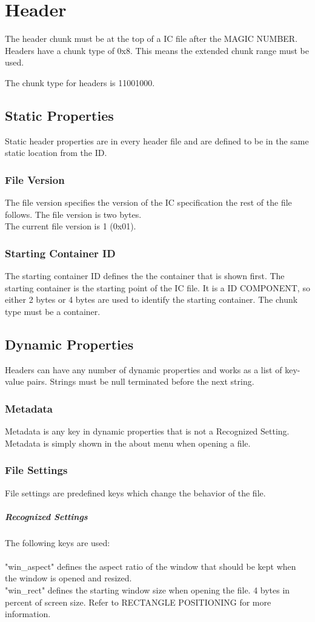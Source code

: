 \documentclass{report}
\begin{document}
\section{Header}
The header chunk must be at the top of a IC file after the MAGIC NUMBER. 
Headers have a chunk type of 0x8.
This means the extended chunk range must be used.

The chunk type for headers is 11001000. 

\subsection{Static Properties}
Static header properties are in every header file and are defined to be in the same static location from the ID. 

\subsubsection{File Version}
The file version specifies the version of the IC specification the rest of the file follows. The file version is two bytes.\\
The current file version is 1 (0x01).

\subsubsection{Starting Container ID}
The starting container ID defines the the container that is shown first. The starting container is the starting point of the IC file. It is a ID COMPONENT, so either 2 bytes or 4 bytes are used to identify the starting container. The chunk type must be a container.

\subsection{Dynamic Properties}
Headers can have any number of dynamic properties and works as a list of key-value pairs. Strings must be null terminated before the next string.
\subsubsection{Metadata}
Metadata is any key in dynamic properties that is not a Recognized Setting. Metadata is simply shown in the about menu when opening a file.
\subsubsection{File Settings}
File settings are predefined keys which change the behavior of the file. 
\subparagraph{Recognized Settings}
The following keys are used:\\
\\
"win\_aspect" defines the aspect ratio of the window that should be kept when the window is opened and resized.\\
"win\_rect" defines the starting window size when opening the file. 4 bytes in percent of screen size. Refer to RECTANGLE POSITIONING for more information.
\end{document}
